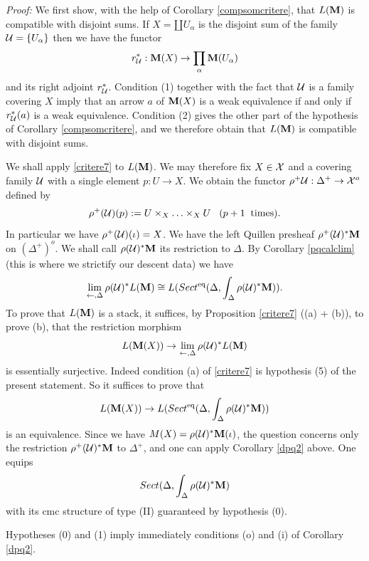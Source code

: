 {\em Proof:}
We first show, with the help of Corollary \ref{compsomcritere},
that $L({\bf M} )$ is compatible with disjoint sums. If $X=\amalg U_{\alpha}$
is the disjoint sum of the family ${\cal U} = \{ U_{\alpha}\}$ then
we have the functor
$$
r_{{\cal U}}^{\ast}: {\bf M} (X)\rightarrow \prod _{\alpha} {\bf M} (U_{\alpha})
$$
and its right adjoint $r_{{\cal U}}^{\ast}$. Condition (1) together with the fact
that ${\cal U}$ is a family covering $X$ imply that an arrow $a$ of
${\bf M} (X)$ is a weak equivalence if and only if $r^{\ast}_{{\cal U}}(a)$
is a weak equivalence. Condition (2) gives the other part of
the hypothesis of Corollary \ref{compsomcritere},
and we therefore obtain that $L({\bf M} )$
is compatible with disjoint sums.

We shall apply \ref{critere7} to $L({\bf M} )$. We may therefore fix $X\in {\cal X}$
and a covering family ${\cal U}$ with a single element
$p:U\rightarrow X$.
We obtain the functor
$\rho ^+{\cal U}: \Delta ^+ \rightarrow {\cal X}
^o$ defined by
$$
\rho ^+({\cal U} )(p) := U \times _X \ldots \times _XU \;\;\; (p+1 \;\;
\mbox{times}).
$$
In particular
we have $\rho ^+ ({\cal U} )(\iota ) = X$. We have the left Quillen
presheaf $\rho ^+ ({\cal U} )^{\ast} {\bf M}$ on $(\Delta ^+)^o$. We shall call
$\rho ({\cal U} )^{\ast} {\bf M}$ its restriction to $\Delta$. By Corollary
\ref{pqcalclim} (this is where we strictify our descent data) we have
$$
\lim _{\leftarrow , \Delta} \rho ({\cal U} )^{\ast}L({\bf M} )
\cong L(Sect ^{\rm eq}(\Delta , \int _{\Delta}\rho ({\cal U} )^{\ast}{\bf M} )).
$$
To prove that $L({\bf M} )$ is a stack, it suffices, by Proposition
\ref{critere7} ((a) + (b)), to prove (b), that the restriction morphism
$$
L({\bf M} (X))\rightarrow \lim _{\leftarrow , \Delta} \rho ({\cal U} )^{\ast}L({\bf M} )
$$
is essentially surjective.
Indeed condition (a) of \ref{critere7}
is hypothesis (5) of the present statement.
So it suffices to prove that
$$
L({\bf M} (X))\rightarrow
L(Sect ^{\rm eq}(\Delta , \int _{\Delta}\rho ({\cal U} )^{\ast}{\bf M} ))
$$
is an equivalence.
Since we have $M(X)=\rho ({\cal U} )^{\ast}{\bf M} (\iota )$, the question concerns
only the restriction $\rho ^+({\cal U} )^{\ast}{\bf M}$ to $\Delta ^+$, and one can
apply Corollary \ref{dpq2} above.
One equips
$$
Sect (\Delta , \int _{\Delta}\rho ({\cal U} )^{\ast}{\bf M} )
$$
with its cmc structure of type (II) guaranteed by hypothesis (0).

Hypotheses (0) and (1) imply
immediately conditions (o) and (i) of Corollary \ref{dpq2}.


